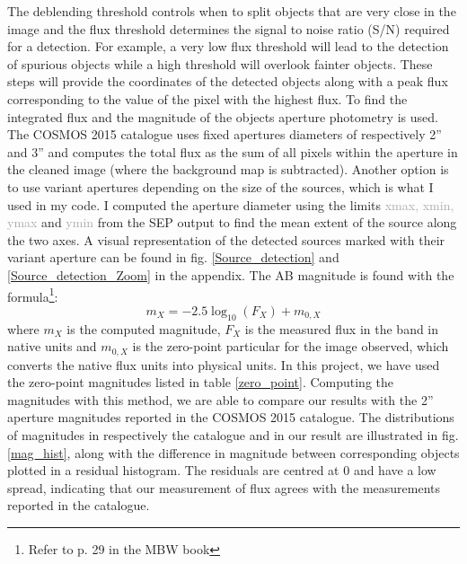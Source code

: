 The deblending threshold controls when to split objects that are very close in the image and the flux threshold determines the signal to noise ratio (S/N) required for a detection. For example, a very low flux threshold will lead to the detection of spurious objects while a high threshold will overlook fainter objects. These steps will provide the coordinates of the detected objects along with a peak flux corresponding  to the value of the pixel with the highest flux. To find the integrated flux and the magnitude of the objects aperture photometry is used. The COSMOS 2015 catalogue uses fixed apertures diameters of respectively 2'' and 3'' and computes the total flux as the sum of all pixels within the aperture in the cleaned image (where the background map is subtracted). Another option is to use variant apertures depending on the size of the sources, which is what I used in my code. I computed the aperture diameter using the limits \textcolor{darkgray}{xmax, xmin, ymax} and \textcolor{darkgray}{ymin} from the SEP output to find the mean extent of the source along the two axes. A visual representation of the detected sources marked with their variant aperture can be found in fig. \ref{Source_detection} and \ref{Source_detection_Zoom} in the appendix. The AB magnitude is found with the formula\footnote{Refer to p. 29 in the MBW book}:
\begin{equation}
    m_X = -2.5\log_{10}(F_X) + m_{0,X}
\end{equation}
where $m_X$ is the computed magnitude, $F_X$ is the measured flux in the band in native units and $m_{0,X}$ is the zero-point particular for the image observed, which converts the native flux units into physical units. In this project, we have used the zero-point magnitudes listed in table \ref{zero_point}. Computing the magnitudes with this method, we are able to compare our results with the 2'' aperture magnitudes reported in the COSMOS 2015 catalogue. The distributions of magnitudes in respectively the catalogue and in our result are illustrated in fig.\ref{mag_hist}, along with the difference in magnitude between corresponding objects plotted in a residual histogram. The residuals are centred at 0 and have a low spread, indicating that our measurement of flux agrees with the measurements reported in the catalogue.
